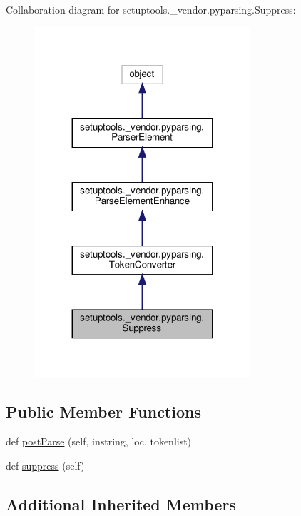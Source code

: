 Collaboration diagram for setuptools.\+\_\+vendor.\+pyparsing.\+Suppress\+:
\nopagebreak
\begin{figure}[H]
\begin{center}
\leavevmode
\includegraphics[width=227pt]{classsetuptools_1_1__vendor_1_1pyparsing_1_1Suppress__coll__graph}
\end{center}
\end{figure}
\subsection*{Public Member Functions}
\begin{DoxyCompactItemize}
\item 
def \hyperlink{classsetuptools_1_1__vendor_1_1pyparsing_1_1Suppress_a99f780117a65983c3f486a3a0c5c7e73}{post\+Parse} (self, instring, loc, tokenlist)
\item 
def \hyperlink{classsetuptools_1_1__vendor_1_1pyparsing_1_1Suppress_a92b705f99f29fbc08b3c1eadec9cc090}{suppress} (self)
\end{DoxyCompactItemize}
\subsection*{Additional Inherited Members}


